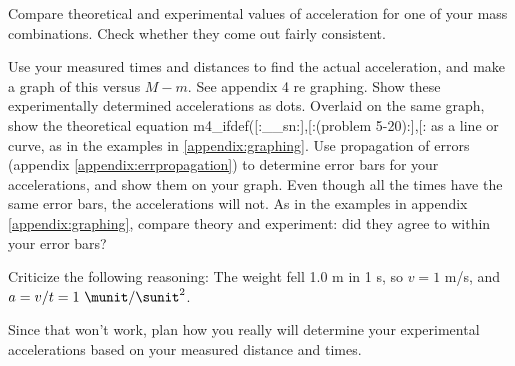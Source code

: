 \selfcheck

Compare theoretical and experimental values of
acceleration for one of your mass combinations.
Check whether they come out fairly consistent.

\analysis

Use your measured times and distances to find the actual
acceleration, and make a graph of this versus $M-m$. 
See appendix 4 re graphing.
Show
these experimentally determined accelerations as dots.
Overlaid on the same graph, show the theoretical
equation %
m4_ifdef([:__sn:],[:(problem 5-20):],[:%
as a line or curve, as in the examples in \ref{appendix:graphing}.
Use propagation of errors (appendix \ref{appendix:errpropagation}) to determine error bars 
for your accelerations, and show them on your graph.
Even though all the times have the same error bars, the accelerations will not.
As in the examples in appendix \ref{appendix:graphing}, compare theory and
experiment: did they agree
to within your error bars?

\prelab

\prelabquestion Criticize the following reasoning: 
The weight fell 1.0
m in 1 s, so $v=1$ m/s, and $a=v/t=1\ \munit/\sunit^2$.

\prelabquestion Since that won't work, plan how you really will
determine your experimental accelerations based on your
measured distance and times.
